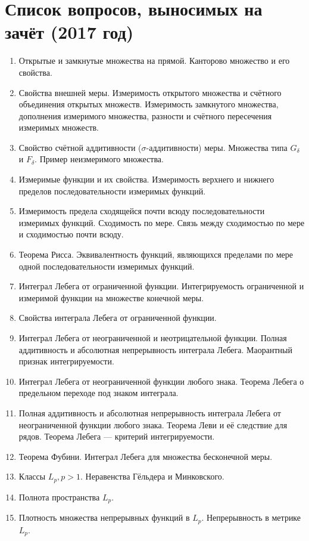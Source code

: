 \documentclass[10pt]{extarticle}
\begin{document}
	\section*{Список вопросов, выносимых на зачёт (2017 год)}
	\begin{enumerate}
		\item Открытые и замкнутые множества на прямой. Канторово множество и его свойства.
		\item Свойства внешней меры. Измеримость открытого множества и счётного объединения открытых множеств. Измеримость замкнутого множества, дополнения измеримого множества, разности и счётного пересечения измеримых множеств.
		\item Свойство счётной аддитивности ($\sigma$-аддитивности) меры. Множества типа $G_{\delta}$ и $F_{\delta}$. Пример неизмеримого множества.
		\item Измеримые функции и их свойства. Измеримость верхнего и нижнего пределов последовательности измеримых функций.
		\item Измеримость предела сходящейся почти всюду последовательности измеримых функций. Сходимость по мере. Связь между сходимостью по мере и сходимостью почти всюду.
		\item Теорема Рисса. Эквивалентность функций, являющихся пределами по мере одной последовательности измеримых функций.
		\item Интеграл Лебега от ограниченной функции. Интегрируемость ограниченной и измеримой функции на множестве конечной меры.
		\item Свойства интеграла Лебега от ограниченной функции.
		\item Интеграл Лебега от неограниченной и неотрицательной функции. Полная аддитивность и абсолютная непрерывность интеграла Лебега. Маорантный признак интегрируемости.
		\item Интеграл Лебега от неограниченной функции любого знака. Теорема Лебега о предельном переходе под знаком интеграла.
		\item Полная аддитивность и абсолютная непрерывность интеграла Лебега от неограниченной функции любого знака. Теорема Леви и её следствие для рядов. Теорема Лебега --- критерий интегрируемости.
		\item Теорема Фубини. Интеграл Лебега для множества бесконечной меры.
		\item Классы $L_p, p > 1$. Неравенства Гёльдера и Минковского.
		\item Полнота пространства $L_p$.
		\item Плотность множества непрерывных функций в $L_p$. Непрерывность в метрике $L_p$.

\end{enumerate}
\end{document}
